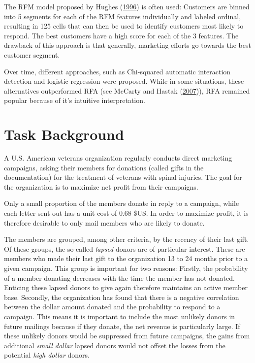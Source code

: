 \documentclass[
  11pt,
  a4paper,
  DIV=12,captions=tableheading,oneside,titlepage=firstiscover,abstracton]{scrreprt}
\begin{document}
The RFM model proposed by Hughes (\protect\hyperlink{ref-hughes-rfm-boost-response}{1996}) is often used: Customers are binned into 5 segments for each of the RFM features individually and labeled ordinal, resulting in 125 cells that can then be used to identify customers most likely to respond. The best customers have a high score for each of the 3 features. The drawback of this approach is that generally, marketing efforts go towards the best customer segment.

Over time, different approaches, such as Chi-squared automatic interaction detection and logistic regression were proposed. While in some situations, these alternatives outperformed RFA (see McCarty and Hastak (\protect\hyperlink{ref-MCCARTY2007656}{2007})), RFA remained popular because of it's intuitive interpretation.

\hypertarget{task-background}{%
\section{Task Background}\label{task-background}}

A U.S. American veterans organization regularly conducts direct marketing campaigns, asking their members for donations (called gifts in the documentation) for the treatment of veterans with spinal injuries. The goal for the organization is to maximize net profit from their campaigns.

Only a small proportion of the members donate in reply to a campaign, while each letter sent out has a unit cost of 0.68 \$US. In order to maximize profit, it is therefore desirable to only mail members who are likely to donate.

The members are grouped, among other criteria, by the recency of their last gift. Of these groups, the so-called \emph{lapsed} donors are of particular interest. These are members who made their last gift to the organization 13 to 24 months prior to a given campaign. This group is important for two reasons: Firstly, the probability of a member donating decreases with the time the member has not donated. Enticing these lapsed donors to give again therefore maintains an active member base. Secondly, the organization has found that there is a negative correlation between the dollar amount donated and the probability to respond to a campaign. This means it is important to include the most unlikely donors in future mailings because if they donate, the net revenue is particularly large. If these unlikely donors would be suppressed from future campaigns, the gains from additional \emph{small dollar} lapsed donors would not offset the losses from the potential \emph{high dollar} donors.
\end{document}
